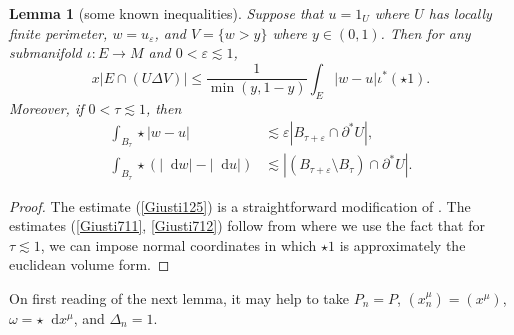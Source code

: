 \documentclass[reqno,10pt]{amsart}
\newcommand*\dif{\mathop{}\!\mathrm{d}}
\newtheorem{lemma}[theorem]{Lemma}
\theoremstyle{definition}
\numberwithin{equation}{section}
\begin{document}
\begin{lemma}[some known inequalities]
Suppose that $u = 1_U$ where $U$ has locally finite perimeter, $w = u_\varepsilon$, and $V = \{w > y\}$ where $y \in (0, 1)$.
Then for any submanifold $\iota: E \to M$ and $0 < \varepsilon \lesssim 1$,
\begin{equation}\label{Giusti125}
x|E \cap (U \Delta V)| \leq \frac{1}{\min(y, 1 - y)} \int_E |w - u| \iota^*(\star 1).
\end{equation}
Moreover, if $0 < \tau \lesssim 1$, then
\begin{align}
\int_{B_\tau} \star |w - u| &\lesssim \varepsilon |B_{\tau + \varepsilon} \cap \partial^* U|, \label{Giusti711}\\
\int_{B_\tau} \star (|\dif w| - |\dif u|) &\lesssim |(B_{\tau + \varepsilon} \setminus B_\tau) \cap \partial^* U|. \label{Giusti712}
\end{align}
\end{lemma}
\begin{proof}
The estimate (\ref{Giusti125}) is a straightforward modification of \cite[Lemma 1.25]{Giusti77}.
The estimates (\ref{Giusti711}, \ref{Giusti712}) follow from \cite[Lemma 7.2]{Giusti77} where we use the fact that for $\tau \lesssim 1$, we can impose normal coordinates in which $\star 1$ is approximately the euclidean volume form.
\end{proof}

On first reading of the next lemma, it may help to take $P_n = P$, $(x^\mu_n) = (x^\mu)$, $\omega = \star \dif x^\mu$, and $\Delta_n = 1$.
\end{document}
